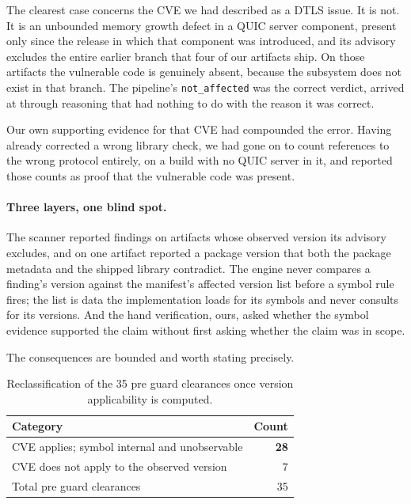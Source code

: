 The clearest case concerns the CVE we had described as a DTLS issue. It is not.
It is an unbounded memory growth defect in a QUIC server component, present only
since the release in which that component was introduced, and its advisory
excludes the entire earlier branch that four of our artifacts ship. On those
artifacts the vulnerable code is genuinely absent, because the subsystem does
not exist in that branch. The pipeline's \texttt{not\_affected} was the correct
verdict, arrived at through reasoning that had nothing to do with the reason it
was correct.

Our own supporting evidence for that CVE had compounded the error. Having
already corrected a wrong library check, we had gone on to count references to
the wrong protocol entirely, on a build with no QUIC server in it, and reported
those counts as proof that the vulnerable code was present.

\paragraph{Three layers, one blind spot.} The scanner reported findings on
artifacts whose observed version its advisory excludes, and on one artifact
reported a package version that both the package metadata and the shipped
library contradict. The engine never compares a finding's version against the
manifest's affected version list before a symbol rule fires; the list is data the
implementation loads for its symbols and never consults for its versions. And
the hand verification, ours, asked whether the symbol evidence supported the
claim without first asking whether the claim was in scope.

The consequences are bounded and worth stating precisely.

\begin{table}[t]
\caption{Reclassification of the 35 pre guard clearances once version
applicability is computed.}
\label{tab:version}
\centering
\begin{tabular}{@{}lr@{}}
\toprule
Category & Count \\
\midrule
CVE applies; symbol internal and unobservable & \textbf{28} \\
CVE does not apply to the observed version & 7 \\
\midrule
Total pre guard clearances & 35 \\
\bottomrule
\end{tabular}
\end{table}

